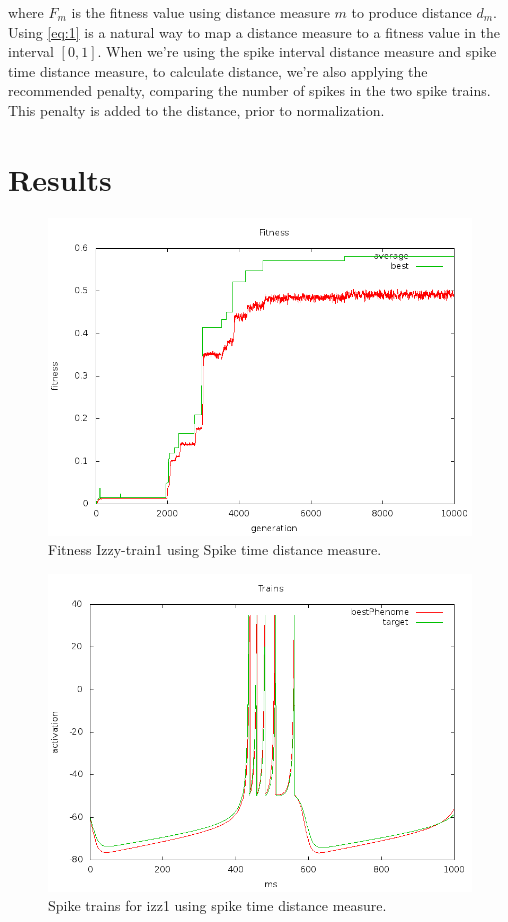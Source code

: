 \documentclass[a4paper]{article}
\begin{document}
\noindent where $F_m$ is the fitness value using distance measure $m$ to produce distance $d_m$. Using \eqref{eq:1} is a natural way to map a distance measure to a fitness value in the interval $[0,1]$. When we're using the spike interval distance measure and spike time distance measure, to calculate distance, we're also applying the recommended penalty, comparing the number of spikes in the two spike trains. This penalty is added to the distance, prior to normalization.

\section{Results}
\label{sec:results}

\begin{figure}[htb!]
  \centering
  \includegraphics[width=\textwidth]{SpikeTime-izzy1-fitness-plot.png}
  \caption{Fitness Izzy-train1 using Spike time distance measure.}
\end{figure}

\begin{figure}[htb!]
  \centering
  \includegraphics[width=\textwidth]{SpikeTime-izzy1-trains-plot.png}
  \caption{Spike trains for izz1 using spike time distance measure.}
\end{figure}
\end{document}
